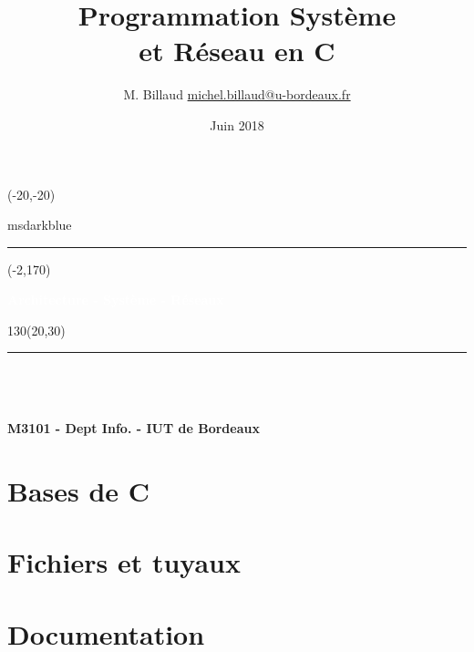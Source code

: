 \documentclass[10pt,twoside,a4]{extreport}
\title{
Programmation Système \\ et Réseau en C
}
\author{M. Billaud \url{michel.billaud@u-bordeaux.fr}}
\date{Juin 2018}
\renewcommand{\maketitle}{

\begin{titlepage}
\setlength{\TPHorizModule}{1mm}
\setlength{\TPVertModule}{1mm}
 
 \begin{textblock}{50}(-20,-20)
  \begin{color}{msdarkblue}
    \rule{3cm}{20cm}    
  \end{color}
\end{textblock}

\begin{textblock}{30}(-2,170)
\begin{rotate}{90}
{\huge\bfseries\textcolor{white}{Architecture - Système - Réseaux}}
\end{rotate}
\end{textblock}
 
 \begin{textblock}{130}(20,30)
 {\noindent\rule{2cm}{2cm}}
 \\[3em]

{
\noindent\Huge\bf \thetitle } \\[3em]
 
{\noindent\Huge\bfseries\sf \thedate} \\[5em]

{\noindent\Large\bfseries\sf M3101 - Dept Info. - IUT de Bordeaux }

 \end{textblock}
\end{titlepage}
\makeatother

\clearpage
}
\begin{document}
 
\sloppy
\maketitle
\begin{abstract}

\end{abstract}

\tableofcontents

\newpage



\newpage


\chapter{Bases de C}



\chapter{Fichiers et tuyaux}



\chapter{Documentation}



\printindex
\end{document}
